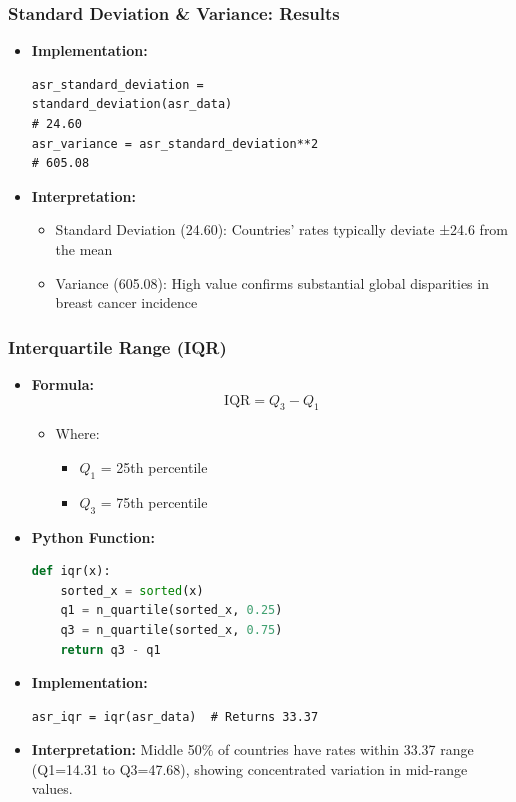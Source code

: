 \begin{frame}[fragile]
    \frametitle{Standard Deviation \& Variance: Results}
    \begin{itemize}
        \item \textbf{Implementation:}
        \begin{lstlisting}
asr_standard_deviation = 
standard_deviation(asr_data)  
# 24.60
asr_variance = asr_standard_deviation**2  
# 605.08
        \end{lstlisting}
        
        \item \textbf{Interpretation:}
        \begin{itemize}
            \item Standard Deviation (\SI{24.60}{\perthousand}): Countries' rates typically deviate ±24.6 from the mean
            \item Variance (605.08): High value confirms substantial global disparities in breast cancer incidence
        \end{itemize}
    \end{itemize}
\end{frame}

\begin{frame}[fragile]
    \frametitle{Interquartile Range (IQR)}
    \begin{itemize}
        \item \textbf{Formula:}
        \[
        \text{IQR} = Q_3 - Q_1
        \]
        \begin{itemize}
            \item Where:
            \begin{itemize}
                \item $Q_1$ = 25th percentile
                \item $Q_3$ = 75th percentile
            \end{itemize}
        \end{itemize}
        
        \item \textbf{Python Function:}
        \begin{lstlisting}[language=Python, breaklines=true]
def iqr(x):
    sorted_x = sorted(x)
    q1 = n_quartile(sorted_x, 0.25)
    q3 = n_quartile(sorted_x, 0.75)
    return q3 - q1
        \end{lstlisting}
        
        \item \textbf{Implementation:}
        \begin{lstlisting}
asr_iqr = iqr(asr_data)  # Returns 33.37
        \end{lstlisting}
        
        \item \textbf{Interpretation:} Middle 50\% of countries have rates within \SI{33.37}{\perthousand} range (Q1=\SI{14.31}{\perthousand} to Q3=\SI{47.68}{\perthousand}), showing concentrated variation in mid-range values.
    \end{itemize}
\end{frame}

